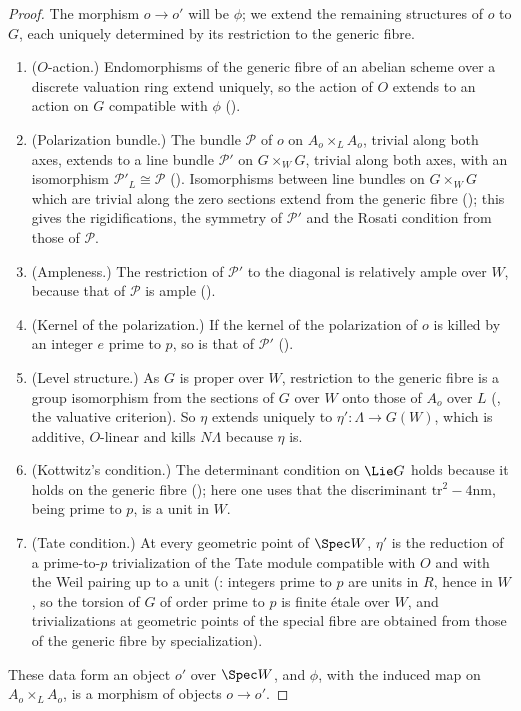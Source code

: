 \begin{proof}
The morphism $o\to o'$ will be $\phi$; we extend the remaining structures of $o$ to $G$, each
uniquely determined by its restriction to the generic fibre.
\begin{enumerate}
\item ($O$-action.) Endomorphisms of the generic fibre of an abelian scheme over a discrete
  valuation ring extend uniquely, so the action of $O$ extends to an action on $G$ compatible with
  $\phi$ ().
\item (Polarization bundle.) The bundle $\mathcal P$ of $o$ on $A_o\times_LA_o$, trivial along both
  axes, extends to a line bundle $\mathcal P'$ on $G\times_WG$, trivial along both axes, with an
  isomorphism $\mathcal P'_L\cong\mathcal P$
  (). Isomorphisms between
  line bundles on $G\times_WG$ which are trivial along the zero sections extend from the generic fibre
  (); this gives the rigidifications, the
  symmetry of $\mathcal P'$ and the Rosati condition from those of $\mathcal P$.
\item (Ampleness.) The restriction of $\mathcal P'$ to the diagonal is relatively ample over $W$,
  because that of $\mathcal P$ is ample
  ().
\item (Kernel of the polarization.) If the kernel of the polarization of $o$ is killed by an integer
  $e$ prime to $p$, so is that of $\mathcal P'$
  ().
\item (Level structure.) As $G$ is proper over $W$, restriction to the generic fibre is a group
  isomorphism from the sections of $G$ over $W$ onto those of $A_o$ over $L$
  (, the valuative
  criterion). So $\eta$ extends uniquely to $\eta'\colon\Lambda\to G(W)$, which is additive,
  $O$-linear and kills $N\Lambda$ because $\eta$ is.
\item (Kottwitz's condition.) The determinant condition on $\Lie G$ holds because it holds on the
  generic fibre (); here
  one uses that the discriminant $\mathrm{tr}^2-4\mathrm{nm}$, being prime to $p$, is a unit in $W$.
\item (Tate condition.) At every geometric point of $\Spec W$, $\eta'$ is the reduction of a
  prime-to-$p$ trivialization of the Tate module compatible with $O$ and with the Weil pairing up to a
  unit (: integers prime to
  $p$ are units in $R$, hence in $W$, so the torsion of $G$ of order prime to $p$ is finite \'etale over
  $W$, and trivializations at geometric points of the special fibre are obtained from those of the
  generic fibre by specialization).
\end{enumerate}
These data form an object $o'$ over $\Spec W$, and $\phi$, with the induced map on $A_o\times_LA_o$, is
a morphism of objects $o\to o'$.
\end{proof}

